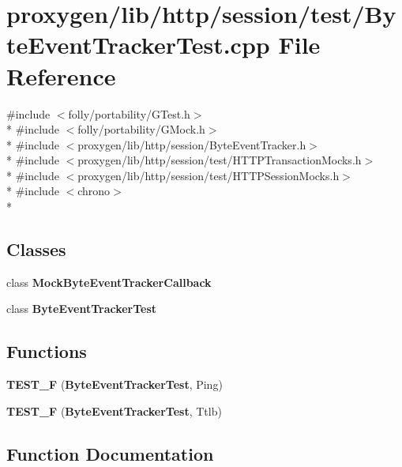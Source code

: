 \section{proxygen/lib/http/session/test/\+Byte\+Event\+Tracker\+Test.cpp File Reference}
\label{ByteEventTrackerTest_8cpp}
{\ttfamily \#include $<$folly/portability/\+G\+Test.\+h$>$}\\*
{\ttfamily \#include $<$folly/portability/\+G\+Mock.\+h$>$}\\*
{\ttfamily \#include $<$proxygen/lib/http/session/\+Byte\+Event\+Tracker.\+h$>$}\\*
{\ttfamily \#include $<$proxygen/lib/http/session/test/\+H\+T\+T\+P\+Transaction\+Mocks.\+h$>$}\\*
{\ttfamily \#include $<$proxygen/lib/http/session/test/\+H\+T\+T\+P\+Session\+Mocks.\+h$>$}\\*
{\ttfamily \#include $<$chrono$>$}\\*
\subsection*{Classes}
\begin{DoxyCompactItemize}
\item 
class {\bf Mock\+Byte\+Event\+Tracker\+Callback}
\item 
class {\bf Byte\+Event\+Tracker\+Test}
\end{DoxyCompactItemize}
\subsection*{Functions}
\begin{DoxyCompactItemize}
\item 
{\bf T\+E\+S\+T\+\_\+F} ({\bf Byte\+Event\+Tracker\+Test}, Ping)
\item 
{\bf T\+E\+S\+T\+\_\+F} ({\bf Byte\+Event\+Tracker\+Test}, Ttlb)
\end{DoxyCompactItemize}


\subsection{Function Documentation}
